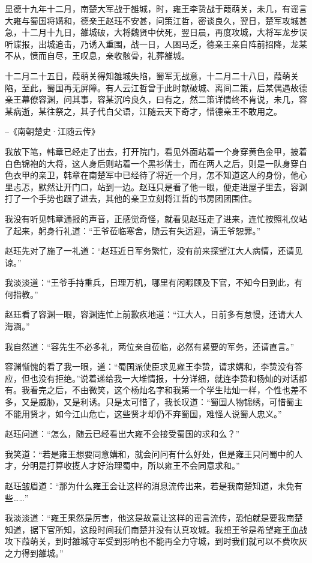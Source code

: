 显德十九年十二月，南楚大军战于雒城，时，雍王李贽战于葭萌关，未几，有谣言大雍与蜀国将媾和，德亲王赵珏不安甚，问策江哲，密谈良久，翌日，楚军攻城甚急，十二月十九日，雒城破，大将魏贤中伏死，翌日晨，再度攻城，大将军龙步误听谍报，出城追击，乃诱入重围，战一日，人困马乏，德亲王亲自阵前招降，龙某不从，愤而自尽，王叹息，亲收骸骨，礼葬雒城。

十二月二十五日，葭萌关得知雒城失陷，蜀军无战意，十二月二十八日，葭萌关陷，至此，蜀国再无屏障。有人云江哲曾于此时献破城、离间二策，后某偶遇故德亲王幕僚容渊，问其事，容某沉吟良久，曰有之，然二策详情终不肯说，未几，容某病逝，某往祭之，其子代白父语，江随云天下奇才，惜德亲王不敢用之。

--《南朝楚史·江随云传》

我放下笔，韩章已经走了出去，打开院门，看见外面站着一个身穿黄色金甲，披着白色锦袍的大将，这人身后则站着一个黑衫儒士，而在两人之后，则是一队身穿白色衣甲的亲卫，韩章在南楚军中已经待了将近一个月，怎不知道这人的身份，他心里忐忑，默然让开门口，站到一边。赵珏只是看了他一眼，便走进屋子里去，容渊打了一个手势也跟了进去，其他的亲卫立刻将江哲的书房团团围住。

我没有听见韩章通报的声音，正感觉奇怪，就看见赵珏走了进来，连忙按照礼仪站了起来，躬身行礼道：“王爷莅临寒舍，随云有失远迎，请王爷恕罪。”

赵珏先对了施了一礼道：“赵珏近日军务繁忙，没有前来探望江大人病情，还请见谅。”

我淡淡道：“王爷手持重兵，日理万机，哪里有闲暇顾及下官，不知今日到此，有何指教。”

赵珏看了容渊一眼，容渊连忙上前歉疚地道：“江大人，日前多有怠慢，还请大人海涵。”

我自然道：“容先生不必多礼，两位亲自莅临，必然有紧要的军务，还请直言。”

容渊惭愧的看了我一眼，道：“蜀国派使臣求见雍王李贽，请求媾和，李贽没有答应，但也没有拒绝。”说着递给我一大堆情报，十分详细，就连李贽和杨灿的对话都有。我看完之后，不由微笑，这个杨灿名字和我第一个学生陆灿一样，个性也差不多，又是威胁，又是利诱。只是太可惜了，我长叹道：“蜀国人物锦绣，可惜蜀主不能用贤才，如今江山危亡，这些贤才却仍不弃蜀国，难怪人说蜀人忠义。”

赵珏问道：“怎么，随云已经看出大雍不会接受蜀国的求和么？”

我笑道：“若是雍王想要同意媾和，就会问问有什么好处，但是雍王只问蜀中的人才，分明是打算收揽人才好治理蜀中，所以雍王不会同意求和。”

赵珏皱眉道：“那为什么雍王会让这样的消息流传出来，若是我南楚知道，未免有些……”

我淡淡道：“雍王果然是厉害，他这是故意让这样的谣言流传，恐怕就是要我南楚知道，据下官所知，这段时间我们南楚并没有认真攻城。我想王爷是希望雍王血战攻下葭萌关，到时雒城守军受到影响也不能再全力守城，到时我们就可以不费吹灰之力得到雒城。”

